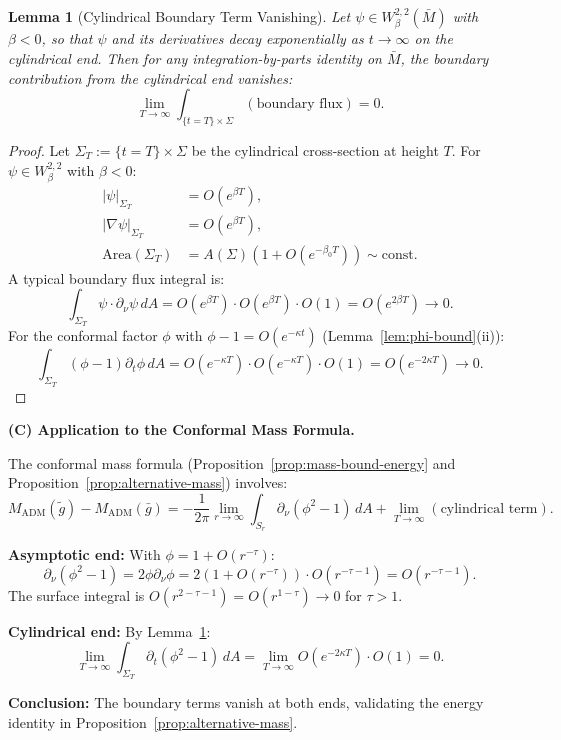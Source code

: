 \documentclass[12pt]{article}
\theoremstyle{plain}
\newtheorem{lemma}[theorem]{Lemma}
\theoremstyle{definition}
\theoremstyle{remark}
\newcommand{\ADM}{\mathrm{ADM}}
\newcommand{\tg}{\tilde{g}}
\newcommand{\bg}{\bar{g}}
\newcommand{\bM}{\bar{M}}
\begin{document}
\begin{lemma}[Cylindrical Boundary Term Vanishing]\label{lem:cylindrical-boundary-vanishing}
Let $\psi \in W^{2,2}_\beta(\bM)$ with $\beta < 0$, so that $\psi$ and its derivatives decay exponentially as $t \to \infty$ on the cylindrical end. Then for any integration-by-parts identity on $\bM$, the boundary contribution from the cylindrical end vanishes:
\[
\lim_{T \to \infty} \int_{\{t = T\} \times \Sigma} (\text{boundary flux}) = 0.
\]
\end{lemma}

\begin{proof}
Let $\Sigma_T := \{t = T\} \times \Sigma$ be the cylindrical cross-section at height $T$. For $\psi \in W^{2,2}_\beta$ with $\beta < 0$:
\begin{align*}
|\psi|_{\Sigma_T} &= O(e^{\beta T}), \\
|\nabla\psi|_{\Sigma_T} &= O(e^{\beta T}), \\
\text{Area}(\Sigma_T) &= A(\Sigma)(1 + O(e^{-\beta_0 T})) \sim \text{const}.
\end{align*}
A typical boundary flux integral is:
\[
\int_{\Sigma_T} \psi \cdot \partial_\nu\psi \, dA = O(e^{\beta T}) \cdot O(e^{\beta T}) \cdot O(1) = O(e^{2\beta T}) \to 0.
\]
For the conformal factor $\phi$ with $\phi - 1 = O(e^{-\kappa t})$ (Lemma~\ref{lem:phi-bound}(ii)):
\[
\int_{\Sigma_T} (\phi - 1) \partial_t\phi \, dA = O(e^{-\kappa T}) \cdot O(e^{-\kappa T}) \cdot O(1) = O(e^{-2\kappa T}) \to 0.
\]
\end{proof}

\textbf{(C) Application to the Conformal Mass Formula.}

The conformal mass formula (Proposition~\ref{prop:mass-bound-energy} and Proposition~\ref{prop:alternative-mass}) involves:
\[
M_{\ADM}(\tg) - M_{\ADM}(\bg) = -\frac{1}{2\pi}\lim_{r \to \infty} \int_{S_r} \partial_\nu(\phi^2 - 1) \, dA + \lim_{T \to \infty}(\text{cylindrical term}).
\]

\textbf{Asymptotic end:} With $\phi = 1 + O(r^{-\tau})$:
\[
\partial_\nu(\phi^2 - 1) = 2\phi\partial_\nu\phi = 2(1 + O(r^{-\tau})) \cdot O(r^{-\tau-1}) = O(r^{-\tau-1}).
\]
The surface integral is $O(r^{2-\tau-1}) = O(r^{1-\tau}) \to 0$ for $\tau > 1$.

\textbf{Cylindrical end:} By Lemma~\ref{lem:cylindrical-boundary-vanishing}:
\[
\lim_{T \to \infty} \int_{\Sigma_T} \partial_t(\phi^2 - 1) \, dA = \lim_{T \to \infty} O(e^{-2\kappa T}) \cdot O(1) = 0.
\]

\textbf{Conclusion:} The boundary terms vanish at both ends, validating the energy identity in Proposition~\ref{prop:alternative-mass}.
\end{document}
